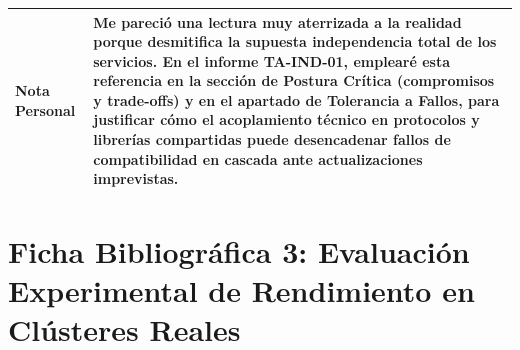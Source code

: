 \documentclass[11pt,a4paper]{article}
\begin{document}
\begin{tabularx}{\textwidth}{|>{\raggedright\arraybackslash}p{3.2cm}|X|}
\hline
\textbf{Nota Personal} & Me pareció una lectura muy aterrizada a la realidad porque desmitifica la supuesta independencia total de los servicios. En el informe TA-IND-01, emplearé esta referencia en la sección de Postura Crítica (compromisos y trade-offs) y en el apartado de Tolerancia a Fallos, para justificar cómo el acoplamiento técnico en protocolos y librerías compartidas puede desencadenar fallos de compatibilidad en cascada ante actualizaciones imprevistas. \\
\hline
\end{tabularx}

\newpage

\section{Ficha Bibliográfica 3: Evaluación Experimental de Rendimiento en Clústeres Reales}
\end{document}
